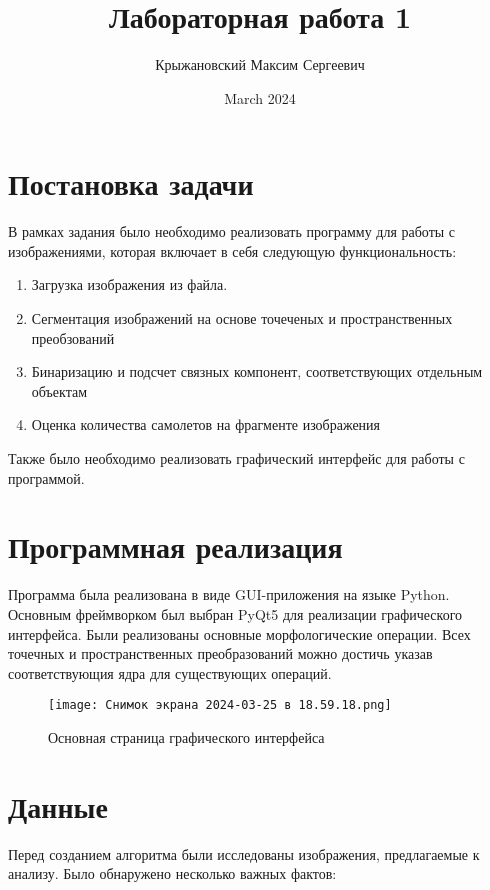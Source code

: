 \documentclass{article}
\title{Лабораторная работа 1}
\author{Крыжановский Максим Сергеевич}
\date{March 2024}
\begin{document}
\maketitle

\section{Постановка задачи}

В рамках задания было необходимо реализовать программу для работы с изображениями, которая включает в себя следующую функциональность:

\begin{enumerate}
    \item Загрузка изображения из файла.
    \item Сегментация изображений на основе точеченых и пространственных преобзований
    \item Бинаризацию и подсчет связных компонент, соответствующих отдельным объектам
    \item Оценка количества самолетов на фрагменте изображения
\end{enumerate}

Также было необходимо реализовать графический интерфейс для работы с программой.

\section{Программная реализация}

Программа была реализована в виде GUI-приложения на языке Python. Основным фреймворком был выбран PyQt5 для реализации графического интерфейса. Были реализованы основные морфологические операции. Всех точечных и пространственных преобразований можно достичь указав соответствующия ядра для существующих операций.

\begin{figure}[h!]
    \centering
    \texttt{[image: Снимок экрана 2024-03-25 в 18.59.18.png]}
    \caption{Основная страница графического интерфейса}
    \label{fig:enter-label}
\end{figure}

\section{Данные}

Перед созданием алгоритма были исследованы изображения, предлагаемые к анализу. Было обнаружено несколько важных фактов:
\end{document}
